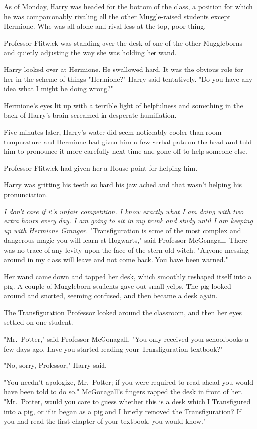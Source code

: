 As of Monday, Harry was headed for the bottom of the class, a position for
which he was companionably rivaling all the other Muggle-raised students
except Hermione. Who was all alone and rival-less at the top, poor thing.

Professor Flitwick was standing over the desk of one of the other Muggleborns
and quietly adjusting the way she was holding her wand.

Harry looked over at Hermione. He swallowed hard. It was the obvious role for
her in the scheme of things{\el} "Hermione?" Harry said tentatively. "Do you
have any idea what I might be doing wrong?"

Hermione's eyes lit up with a terrible light of helpfulness and something in
the back of Harry's brain screamed in desperate humiliation.

Five minutes later, Harry's water did seem noticeably cooler than room
temperature and Hermione had given him a few verbal pats on the head and told
him to pronounce it more carefully next time and gone off to help someone else.

Professor Flitwick had given her a House point for helping him.

Harry was gritting his teeth so hard his jaw ached and that wasn't helping his
pronunciation.

\emph{I don't care if it's unfair competition. I know exactly what I am doing
with two extra hours every day. I am going to sit in my trunk and study until I
am keeping up with Hermione Granger.}
\sbreak
"Transfiguration is some of the most complex and dangerous magic you will learn
at Hogwarts," said Professor McGonagall. There was no trace of any levity upon
the face of the stern old witch. "Anyone messing around in my class will leave
and not come back. You have been warned."

Her wand came down and tapped her desk, which smoothly reshaped itself into a
pig. A couple of Muggleborn students gave out small yelps. The pig looked
around and snorted, seeming confused, and then became a desk again.

The Transfiguration Professor looked around the classroom, and then her eyes
settled on one student.

"Mr.~Potter," said Professor McGonagall. "You only received your schoolbooks a
few days ago. Have you started reading your Transfiguration textbook?"

"No, sorry, Professor," Harry said.

"You needn't apologize, Mr.~Potter; if you were required to read ahead you
would have been told to do so." McGonagall's fingers rapped the desk in front
of her. "Mr.~Potter, would you care to guess whether this is a desk which I
Transfigured into a pig, or if it began as a pig and I briefly removed the
Transfiguration? If you had read the first chapter of your textbook, you would
know."

